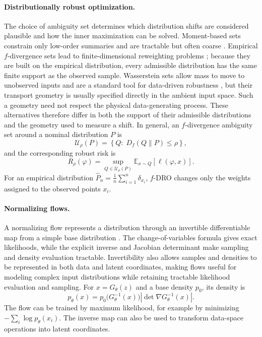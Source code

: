\documentclass[11pt]{article}
\newcommand{\E}{\mathbb{E}}
\newcommand{\design}{\varphi}
\begin{document}
\paragraph{Distributionally robust optimization.}
The choice of ambiguity set determines which distribution shifts are considered plausible and
how the inner maximization can be solved. Moment-based sets constrain only low-order summaries
and are tractable but often coarse \citep{delage2010}. Empirical $f$-divergence sets lead to
finite-dimensional reweighting problems \citep{ben-tal2009,namkoong2016,duchi2021}; because
they are built on the empirical distribution, every admissible distribution has the same finite
support as the observed sample. Wasserstein sets allow mass to move to unobserved inputs and
are a standard tool for data-driven robustness \citep{esfahani2018,kuhn2019}, but their
transport geometry is usually specified directly in the ambient input space. Such a geometry
need not respect the physical data-generating process. These alternatives therefore differ in
both the support of their admissible distributions and the geometry used to measure a shift.
In general, an $f$-divergence ambiguity set around a nominal distribution $P$ is
\begin{equation}
  \label{eq:background-dro}
  \mathcal{U}_\rho(P)=\left\{Q:\;D_f(Q\|P)\leq\rho\right\},
\end{equation}
and the corresponding robust risk is
\begin{equation}
  \label{eq:background-robust-risk}
  R_\rho(\design)=\sup_{Q\in\mathcal{U}_\rho(P)}
  \E_{x\sim Q}[\ell(\design,x)].
\end{equation}
For an empirical distribution $\widehat P_n=\frac{1}{n}\sum_{i=1}^n\delta_{x_i}$,
$f$-DRO changes only the weights assigned to the observed points $x_i$.

\paragraph{Normalizing flows.}
A normalizing flow represents a distribution through an invertible differentiable map from a
simple base distribution \citep{rezende2015,dinh2017,papamakarios2021}. The change-of-variables
formula gives exact likelihoods, while the explicit inverse and Jacobian determinant make
sampling and density evaluation tractable. Invertibility also allows samples and densities to
be represented in both data and latent coordinates, making flows useful for modeling complex
input distributions while retaining tractable likelihood evaluation and sampling.
For $x=G_\theta(z)$ and a base density $p_0$, its density is
\begin{equation}
  \label{eq:background-flow}
  p_\theta(x)=p_0\big(G_\theta^{-1}(x)\big)
  \left|\det\nabla G_\theta^{-1}(x)\right|.
\end{equation}
The flow can be trained by maximum likelihood, for example by minimizing
$-\sum_i\log p_\theta(x_i)$. The inverse map can also be used to transform data-space
operations into latent coordinates.
\end{document}
